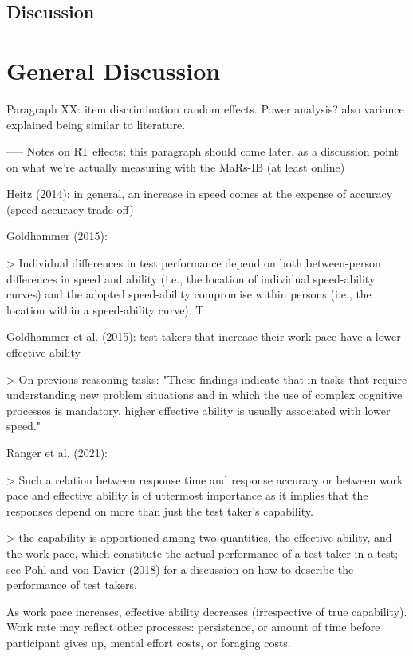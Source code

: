 \documentclass[a4paper,man,natbib]{apa6}
\begin{document}
\subsection{Discussion}

\section{General Discussion}

Paragraph XX: item discrimination random effects. Power analysis? also variance explained being similar to literature.

-----
Notes on RT effects: this paragraph should come later, as a discussion point on what we're actually measuring with the MaRs-IB (at least online)

Heitz (2014): in general, an increase in speed comes at the expense of accuracy (speed-accuracy trade-off)

Goldhammer (2015): 

> Individual differences in test performance depend on both between-person differences in speed and ability (i.e., the location of individual speed-ability curves) and the adopted speed-ability compromise within persons (i.e., the location within a speed-ability curve). T

Goldhammer et al. (2015): test takers that increase their work pace have a lower effective ability

> On previous reasoning tasks: "These findings indicate that in tasks that require understanding new problem situations and in which the use of complex cognitive processes is mandatory, higher effective ability is usually associated with lower speed." 

Ranger et al. (2021): 

> Such a relation between response time and response accuracy or between work pace and effective ability is of uttermost importance as it implies that the responses depend on more than just the test taker’s capability.

> the capability is apportioned among two quantities, the effective ability, and the work pace, which constitute the actual performance of a test taker in a test; see Pohl and von Davier (2018) for a discussion on how to describe the performance of test takers. 

As work pace increases, effective ability decreases (irrespective of true capability). Work rate may reflect other processes: persistence, or amount of time before participant gives up, mental effort costs, or foraging costs.  
\end{document}
